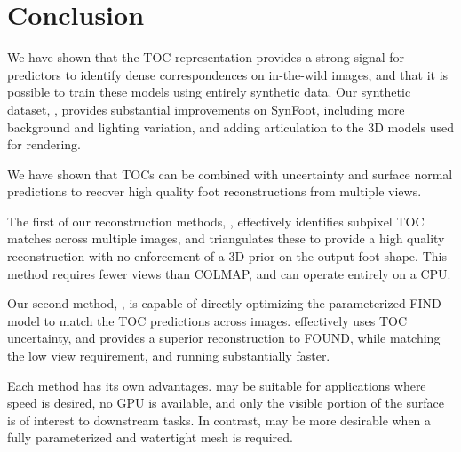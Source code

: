 \section{Conclusion}

We have shown that the TOC representation provides a strong signal for predictors to identify dense correspondences on in-the-wild images, and that it is possible to train these models using entirely synthetic data. Our synthetic dataset, \ourSynth, provides substantial improvements on SynFoot, including more background and lighting variation, and adding articulation to the 3D models used for rendering.

We have shown that TOCs can be combined with uncertainty and surface normal predictions to recover high quality foot reconstructions from multiple views.

The first of our reconstruction methods, \ourSfM, effectively identifies subpixel TOC matches across multiple images, and triangulates these to provide a high quality reconstruction with no enforcement of a 3D prior on the output foot shape. This method requires fewer views than COLMAP, and can operate entirely on a CPU.

Our second method, \ourOptim, is capable of directly optimizing the parameterized FIND model to match the TOC predictions across images. \ourOptim effectively uses TOC uncertainty, and provides a superior reconstruction to FOUND, while matching the low view requirement, and running substantially faster.

Each method has its own advantages. \ourSfM may be suitable for applications where speed is desired, no GPU is available, and only the visible portion of the surface is of interest to downstream tasks. In contrast, \ourOptim may be more desirable when a fully parameterized and watertight mesh is required.